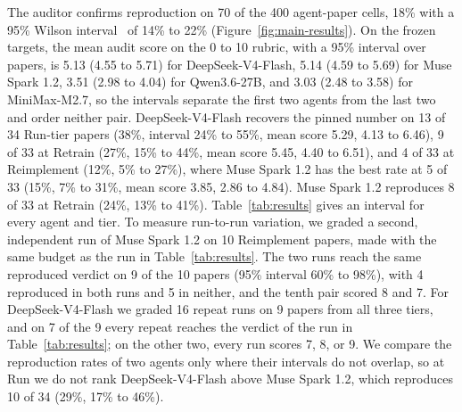 \documentclass{article} %
\newcommand{\todo}[1]{#1}%
\begin{document}
The auditor confirms reproduction on 70 of the 400 agent-paper cells, 18\% with
a 95\% Wilson interval~\citep{wilson1927probable} of 14\% to 22\%
(Figure~\ref{fig:main-results}). %
On the frozen targets, the mean audit score on the 0 to 10 rubric, with a 95\%
interval over papers, is 5.13 (4.55 to 5.71) for DeepSeek-V4-Flash, 5.14 (4.59
to 5.69) for Muse Spark 1.2, 3.51 (2.98 to 4.04) for Qwen3.6-27B, and 3.03
(2.48 to 3.58) for MiniMax-M2.7, so the intervals separate the first two agents
from the last two and order neither pair. %
DeepSeek-V4-Flash recovers the pinned number on 13 of 34 Run-tier papers (38\%, interval 24\%
to 55\%, mean score 5.29, 4.13 to 6.46), 9 of 33 at Retrain (27\%, 15\% to 44\%,
mean score 5.45, 4.40 to 6.51), and 4 of 33 at Reimplement
(12\%, 5\% to 27\%), where Muse Spark 1.2 has the best rate at 5 of 33 (15\%,
7\% to 31\%, mean score 3.85, 2.86 to 4.84). Muse Spark 1.2 reproduces 8 of 33 at Retrain (24\%, 13\% to 41\%).
Table~\ref{tab:results} gives an interval for every agent and tier.
To measure run-to-run variation, we graded a second, independent run of
Muse Spark 1.2 on 10 Reimplement papers, made with the same budget as the run
in Table~\ref{tab:results}. The two runs reach the same reproduced verdict on 9
of the 10 papers (95\% interval 60\% to 98\%), with 4 reproduced in both runs
and 5 in neither, and the tenth pair scored 8 and 7.
For DeepSeek-V4-Flash we graded \todo{16} repeat runs on \todo{9} papers from
all three tiers, and on \todo{7 of the 9} every repeat reaches the verdict of
the run in Table~\ref{tab:results}; on the other \todo{two}, every run scores
7, 8, or 9.
We compare the reproduction rates of two agents only where their intervals
do not overlap, so at Run we do not rank
DeepSeek-V4-Flash above Muse Spark 1.2, which reproduces 10 of 34 (29\%, 17\% to
46\%). %
\end{document}
